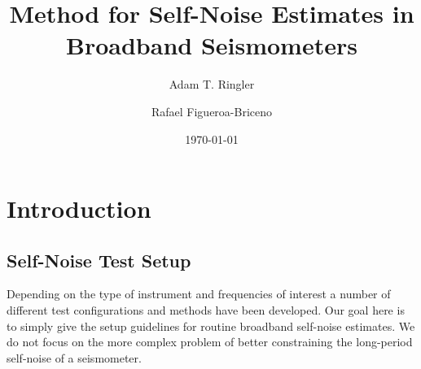 \documentclass[12pt]{amsart}
\begin{document}
\title{Method for Self-Noise Estimates in Broadband Seismometers}
\author{Adam T. Ringler}
\author{Rafael Figueroa-Briceno}
\date{\today}
\address{U.S. Geological Survey, Albuquerque Seismological Laboratory, P.O. Box 82010, Albuquerque, NM 87198-2010}

\maketitle




\section{Introduction}

\subsection{Self-Noise Test Setup}
Depending on the type of instrument and frequencies of interest a number of different test configurations
and methods have been developed.  Our goal here is to simply give the setup guidelines for routine broadband 
self-noise estimates.  We do not focus on the more complex problem of better constraining the long-period self-noise
of a seismometer.
\end{document}
